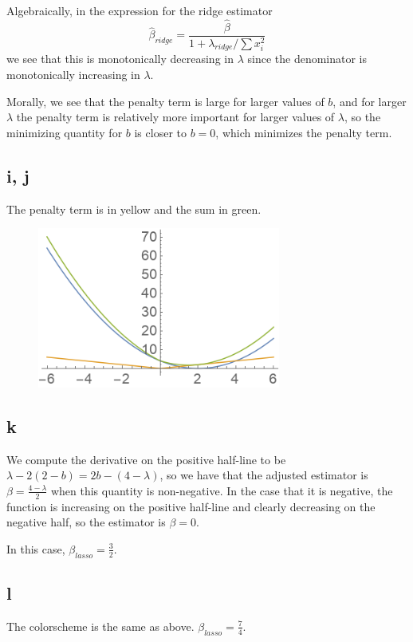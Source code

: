 \documentclass[12pt,letterpaper]{article}
\theoremstyle{definition}
\begin{document}
Algebraically, in the expression for the ridge estimator
\[
  \hat{\beta}_{ridge} = \frac{\hat{\beta}}{1 + \lambda_{ridge}/\sum x_{i}^{2}}
\]
we see that this is monotonically decreasing in $\lambda$ since the denominator is monotonically increasing in $\lambda$.

Morally, we see that the penalty term is large for larger values of $b$, and for larger $\lambda$ the penalty term is relatively more important for larger values of $\lambda$, so the minimizing quantity for $b$ is closer to $b = 0$, which minimizes the penalty term.

\subsection*{i, j}

The penalty term is in yellow and the sum in green.

\begin{figure}[H]
  \centering
  \includegraphics[width=8cm]{plot4.png}
\end{figure}

\subsection*{k}

We compute the derivative on the positive half-line to be $\lambda - 2(2 - b) = 2b - (4 - \lambda)$, so we have that the adjusted estimator is $\beta = \frac{4 - \lambda}{2}$ when this quantity is non-negative. In the case that it is negative, the function is increasing on the positive half-line and clearly decreasing on the negative half, so the estimator is $\beta = 0$.

In this case, $\beta_{lasso} = \frac{3}{2}$.

\subsection*{l}

The colorscheme is the same as above. $\beta_{lasso} = \frac{7}{4}$.
\end{document}
